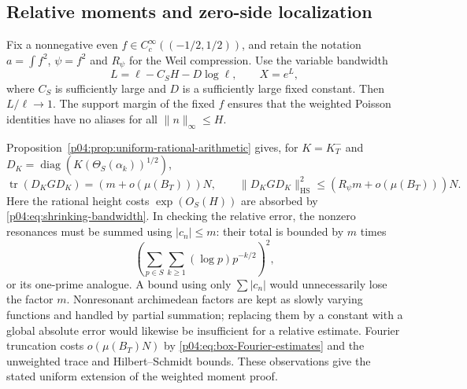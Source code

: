 \documentclass[11pt,letterpaper]{article}
\theoremstyle{definition}
\theoremstyle{remark}
\DeclareMathOperator{\tr}{tr}
\newcommand{\1}{\mathbf 1}
\begin{document}
\subsection{Relative moments and zero-side localization}

Fix a nonnegative even $f\in C_c^\infty((-1/2,1/2))$, and retain
the notation $a=\int f^2$, $\psi=f^2$ and $R_\psi$ for the Weil
compression. Use the variable bandwidth
\begin{equation}\label{p04:eq:shrinking-bandwidth}
 L=\ell-C_SH-D\log\ell,\qquad X=e^L,
\end{equation}
where $C_S$ is sufficiently large and $D$ is a sufficiently large
fixed constant.  Then $L/\ell\to1$.  The support margin of the
fixed $f$ ensures that the weighted Poisson identities have no
aliases for all $\|n\|_\infty\le H$.

Proposition~\ref{p04:prop:uniform-rational-arithmetic} gives, for
$K=K^-_T$ and $D_K=\operatorname{diag}(K(\Theta_S(\alpha_k))^{1/2})$,
\begin{equation}\label{p04:eq:shrinking-relative-moments}
 \tr(D_KGD_K)=(m+o(\mu(B_T)))N,
 \qquad
 \|D_KGD_K\|_{\mathrm{HS}}^2
       \le(R_\psi m+o(\mu(B_T)))N.
\end{equation}
Here the rational height costs $\exp(O_S(H))$ are absorbed by
\eqref{p04:eq:shrinking-bandwidth}.  In checking the relative error,
the nonzero resonances must be summed using $|c_n|\le m$:
their total is bounded by $m$ times
\[
 \left(\sum_{p\in S}\sum_{k\ge1}(\log p)p^{-k/2}\right)^2,
\]
or its one-prime analogue.  A bound using only $\sum|c_n|$ would
unnecessarily lose the factor $m$.  Nonresonant archimedean factors
are kept as slowly varying functions and handled by partial
summation; replacing them by a constant with a global absolute
error would likewise be insufficient for a relative estimate.
Fourier truncation costs $o(\mu(B_T)N)$ by
\eqref{p04:eq:box-Fourier-estimates} and the unweighted trace and
Hilbert--Schmidt bounds.  These observations give the stated
uniform extension of the weighted moment proof.
\end{document}
